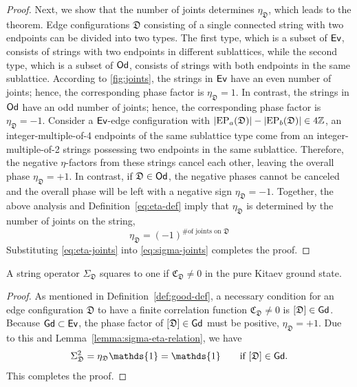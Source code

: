 \begin{proof}
    Next, we show that the number of joints determines $\eta_\mathfrak{D}$, which leads to the theorem. Edge configurations $\mathfrak{D}$ consisting of a single connected string with two endpoints can be divided into two types. The first type, which is a subset of $\mathbf{\mathsf{Ev}}$, consists of strings with two endpoints in different sublattices, while the second type, which is a subset of $\mathbf{\mathsf{Od}}$, consists of strings with both endpoints in the same sublattice. According to \autoref{fig:joints}, the strings in $\mathbf{\mathsf{Ev}}$ have an even number of joints; hence, the corresponding phase factor is $\eta_\mathfrak{D} = 1$. In contrast, the strings in $\mathbf{\mathsf{Od}}$ have an odd number of joints; hence, the corresponding phase factor is $\eta_\mathfrak{D} = -1$. Consider a $\mathbf{\mathsf{Ev}}$-edge configuration with $\abs{\mathrm{EP}_a(\mathfrak{D})} - \abs{\mathrm{EP}_b(\mathfrak{D})} \in 4\mathbb{Z}$, an integer-multiple-of-4 endpoints of the same sublattice type come from an integer-multiple-of-2 strings possessing two endpoints in the same sublattice. Therefore, the negative $\eta$-factors from these strings cancel each other, leaving the overall phase $\eta_\mathfrak{D} = +1$. In contrast, if $\mathfrak{D} \in \mathbf{\mathsf{Od}}$, the negative phases cannot be canceled and the overall phase will be left with a negative sign $\eta_\mathfrak{D} = -1$. Together, the above analysis and Definition~\eqref{eq:eta-def} imply that $\eta_\mathfrak{D}$ is determined by the number of joints on the string,
    \begin{equation}\label{eq:eta-joints}
        \eta_\mathfrak{D} = (-1)^{\text{\# of joints on $\mathfrak{D}$}} 
    \end{equation}
    Substituting \eqref{eq:eta-joints} into \eqref{eq:sigma-joints} completes the proof.
\end{proof}

\begin{corollary}\label{corollary:good-square}
    A string operator $\Sigma_\mathfrak{D}$ squares to one if $\mathfrak{C}_\mathfrak{D} \neq 0$ in the pure Kitaev ground state.
\end{corollary}
\begin{proof}
    As mentioned in Definition~\ref{def:good-def}, a necessary condition for an edge configuration $\mathfrak{D}$ to have a finite correlation function $\mathfrak{C}_\mathfrak{D} \neq 0$ is $[\mathfrak{D}] \in \mathbf{\mathsf{Gd}}$. Because $\mathbf{\mathsf{Gd}}\subset\mathbf{\mathsf{Ev}}$, the phase factor of $[\mathfrak{D}] \in \mathbf{\mathsf{Gd}}$ must be positive, $\eta_\mathfrak{D} = +1$. Due to this and Lemma~\ref{lemma:sigma-eta-relation}, we have 
    \[
    \Sigma_\mathfrak{D}^2 = \eta_\mathfrak{D}\mathds{1} = \mathds{1} \qquad \text{if $[\mathfrak{D}] \in \Good$}.
    \]
    This completes the proof.
\end{proof}


